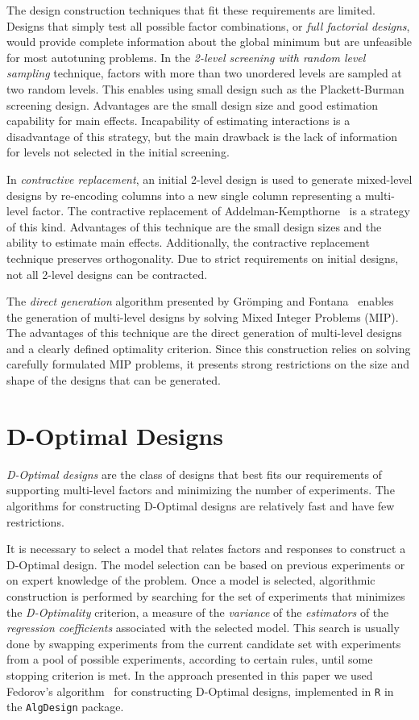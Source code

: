 \documentclass[conference]{IEEEtran}
\begin{document}
The design construction techniques that fit these requirements are limited.
Designs that simply test all possible factor combinations, or \emph{full factorial
designs}, would provide complete information about the global minimum but are
unfeasible for most autotuning problems. In the \emph{2-level screening with random
level sampling} technique, factors with more than two unordered levels are
sampled at two random levels. This enables using small design such as the
Plackett-Burman~\cite{plackett1946design} screening design. Advantages are
the small design size and good estimation capability for main effects.
Incapability of estimating interactions is a disadvantage of this strategy, but
the main drawback is the lack of information for levels not selected in the
initial screening.

In \emph{contractive replacement}, an initial 2-level design is used to generate
mixed-level designs by re-encoding columns into a new single column representing
a multi-level factor. The contractive replacement of
Addelman-Kempthorne~\cite{addelman1961some} is a strategy of this kind.
Advantages of this technique are the small design sizes and the ability to
estimate main effects. Additionally, the contractive replacement technique
preserves orthogonality. Due to strict requirements on initial designs, not all
2-level designs can be contracted.

The \emph{direct generation} algorithm presented by Grömping and
Fontana~\cite{ulrike2018algorithm} enables the generation of multi-level
designs by solving Mixed Integer Problems (MIP). The advantages of this
technique are the direct generation of multi-level designs and a clearly defined
optimality criterion. Since this construction relies on solving carefully
formulated MIP problems, it presents strong restrictions on the size and shape
of the designs that can be generated.
\section{D-Optimal Designs}
\label{sec:orgf694132}
\emph{D-Optimal designs} are the class of designs that best fits our requirements of
supporting multi-level factors and minimizing the number of experiments. The
algorithms for constructing D-Optimal designs are relatively fast and have few
restrictions.

It is necessary to select a model that relates factors and responses to
construct a D-Optimal design. The model selection can be based on previous
experiments or on expert knowledge of the problem. Once a model is selected,
algorithmic construction is performed by searching for the set of experiments
that minimizes the \emph{D-Optimality} criterion, a measure of the \emph{variance} of the
\emph{estimators} of the \emph{regression coefficients} associated with the selected
model. This search is usually done by swapping experiments from the current
candidate set with experiments from a pool of possible experiments, according to
certain rules, until some stopping criterion is met. In the approach presented
in this paper we used Fedorov's algorithm~\cite{fedorov1972theory} for
constructing D-Optimal designs, implemented in \texttt{R} in the \texttt{AlgDesign} package.
\end{document}
